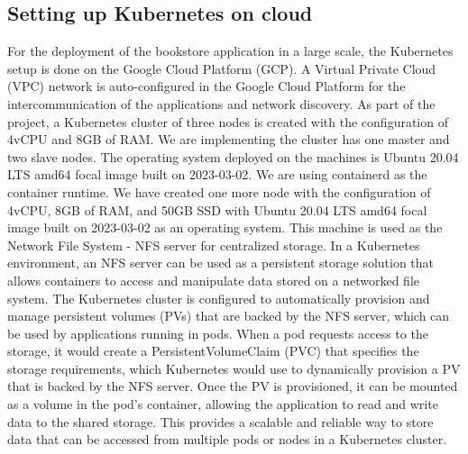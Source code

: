 \subsection{Setting up Kubernetes on cloud}
For the deployment of the bookstore application in a large scale, the Kubernetes setup is done on the Google Cloud Platform (GCP). A Virtual Private Cloud (VPC) network is auto-configured in the Google Cloud Platform for the intercommunication of the applications and network discovery. As part of the project, a Kubernetes cluster of three nodes is created with the configuration of 4vCPU and 8GB of RAM. We are implementing the cluster has one master and two slave nodes. The operating system deployed on the machines is Ubuntu 20.04 LTS amd64 focal image built on 2023-03-02. We are using containerd as the container runtime. We have created one more node with the configuration of 4vCPU, 8GB of RAM, and 50GB SSD with Ubuntu 20.04 LTS amd64 focal image built on 2023-03-02 as an operating system. This machine is used as the Network File System - NFS server for centralized storage. In a Kubernetes environment, an NFS server can be used as a persistent storage solution that allows containers to access and manipulate data stored on a networked file system. The Kubernetes cluster is configured to automatically provision and manage persistent volumes (PVs) that are backed by the NFS server, which can be used by applications running in pods. When a pod requests access to the storage, it would create a PersistentVolumeClaim (PVC) that specifies the storage requirements, which Kubernetes would use to dynamically provision a PV that is backed by the NFS server. Once the PV is provisioned, it can be mounted as a volume in the pod's container, allowing the application to read and write data to the shared storage. This provides a scalable and reliable way to store data that can be accessed from multiple pods or nodes in a Kubernetes cluster.
